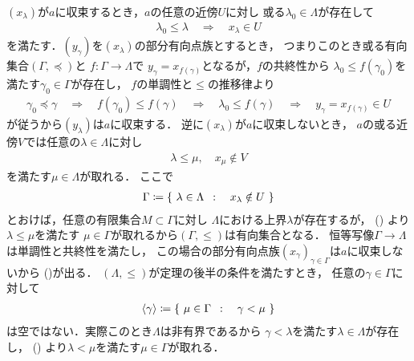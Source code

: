 	\begin{prf}
				$(x_\lambda)$が$a$に収束するとき，$a$の任意の近傍$U$に対し
				或る$\lambda_0 \in \Lambda$が存在して
				\begin{align}
					\lambda_0 \leq \lambda
					\quad \Longrightarrow \quad
					x_\lambda \in U
				\end{align}
				を満たす．$(y_\gamma)$を$(x_\lambda)$の部分有向点族とするとき，
				つまりこのとき或る有向集合$(\Gamma,\preceq)$と
				$f:\Gamma \longrightarrow \Lambda$で
				$y_\gamma = x_{f(\gamma)}$となるが，$f$の共終性から
				$\lambda_0 \leq f(\gamma_0)$を満たす$\gamma_0 \in \Gamma$が存在し，
				$f$の単調性と$\leq$の推移律より
				\begin{align}
					\gamma_0 \preceq \gamma
					\quad \Longrightarrow \quad
					f(\gamma_0) \leq f(\gamma)
					\quad \Longrightarrow \quad
					\lambda_0 \leq f(\gamma)
					\quad \Longrightarrow \quad
					y_\gamma = x_{f(\gamma)} \in U
				\end{align}
				が従うから$(y_\lambda)$は$a$に収束する．
				逆に$(x_\lambda)$が$a$に収束しないとき，
				$a$の或る近傍$V$では任意の$\lambda \in \Lambda$に対し
				\begin{align}
					\lambda \leq \mu,
					\quad x_\mu \notin V
					\label{eq:thm_a_net_converges_iff_every_subnet_converges_1}
				\end{align}
				を満たす$\mu \in \Lambda$が取れる．
				ここで
				\begin{align}
					\Gamma \coloneqq \left\{\ \lambda \in \Lambda\ \, : \quad x_\lambda \notin U\ \right\}
				\end{align}
				とおけば，任意の有限集合$M \subset \Gamma$に対し
				$\Lambda$における上界$\lambda$が存在するが，
				()
				より$\lambda \leq \mu$を満たす
				$\mu \in \Gamma$が取れるから$(\Gamma,\leq)$は有向集合となる．
				恒等写像$\Gamma \longrightarrow \Lambda$は単調性と共終性を満たし，
				この場合の部分有向点族$(x_\gamma)_{\gamma \in \Gamma}$は$a$に収束しないから
				()が出る．
				$(\Lambda,\leq)$が定理の後半の条件を満たすとき，
				任意の$\gamma \in \Gamma$に対して
				\begin{align}
					\inprod<\gamma> \coloneqq
					\Set{\mu \in \Gamma}{\gamma < \mu}
				\end{align}
				は空ではない．実際このとき$\Lambda$は非有界であるから
				$\gamma < \lambda$を満たす$\lambda \in \Lambda$が存在し，
				()
				より$\lambda < \mu$を満たす$\mu \in \Gamma$が取れる．

\end{prf}
